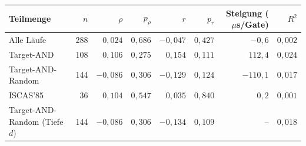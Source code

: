 \begin{tabular}{lrrrrrrr}
\toprule
Teilmenge & $n$ & $\rho$ & $p_\rho$ & $r$ & $p_r$ & Steigung ($\mu$s/Gate) & $R^2$ \\
\midrule
Alle Läufe & 288 & $0{,}024$ & $0{,}686$ & $-0{,}047$ & $0{,}427$ & $-0{,}6$ & $0{,}002$ \\
Target-AND & 108 & $0{,}106$ & $0{,}275$ & $0{,}154$ & $0{,}111$ & $112{,}4$ & $0{,}024$ \\
Target-AND-Random & 144 & $-0{,}086$ & $0{,}306$ & $-0{,}129$ & $0{,}124$ & $-110{,}1$ & $0{,}017$ \\
ISCAS'85 & 36 & $0{,}104$ & $0{,}547$ & $0{,}035$ & $0{,}840$ & $0{,}2$ & $0{,}001$ \\
Target-AND-Random (Tiefe $d$) & 144 & $-0{,}086$ & $0{,}306$ & $-0{,}134$ & $0{,}109$ & -- & $0{,}018$ \\
\bottomrule
\end{tabular}
